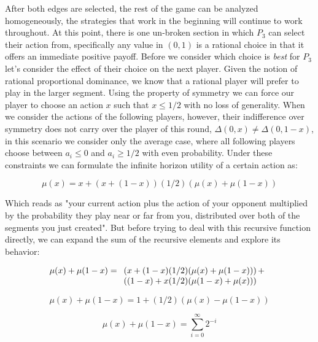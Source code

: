 \documentclass{acm_proc_article-sp}
\begin{document}
After both edges are selected, the rest of the game can be analyzed homogeneously, the strategies that work in the beginning will continue to work throughout. At this point, there is one un-broken section in which $P_3$ can select their action from, specifically any value in $(0, 1)$ is a rational choice in that it offers an immediate positive payoff\cite{perea2012epistemic}. Before we consider which choice is \textit{best} for $P_3$ let's consider the effect of their choice on the next player. Given the notion of rational proportional dominance, we know that a rational player will prefer to play in the larger segment. Using the property of symmetry we can force our player to choose an action $x$ such that $x \leq 1/2$ with no loss of generality. When we consider the actions of the following players, however, their indifference over symmetry does not carry over the player of this round, $\Delta(0, x) \neq \Delta(0, 1-x)$, in this scenario we consider only the average case, where all following players choose between $a_i \leq 0$ and $a_i \geq 1/2$ with even probability. Under these constraints we can formulate the infinite horizon utility of a certain action as:

\begin{equation}
\mu(x) = x + (x + (1 - x))(1/2)(\mu(x) + \mu(1-x))
\end{equation}

Which reads as "your current action plus the action of your opponent multiplied by the probability they play near or far from you, distributed over both of the segments you just created". But before trying to deal with this recursive function directly, we can expand the sum of the recursive elements and explore its behavior:

\begin{equation}
\mu(x) + \mu(1-x) = \\\\
 \begin{array}[t]{l}
      \left( x + (1 - x)(1/2)(\mu(x) + \mu(1-x)) \right)+\\
      \left( (1 - x) + x(1/2)(\mu(1 - x) + \mu(x)) \right)
    \end{array}
\end{equation}

\begin{equation}
\mu(x) + \mu(1-x) = 1 + (1/2)(\mu(x) - \mu(1 - x))
\end{equation}

\begin{equation}
\mu(x) + \mu(1-x) = \sum_{i=0}^{\infty} 2^{-i}
\end{equation}
\end{document}
